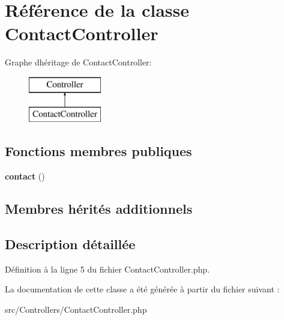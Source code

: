 \hypertarget{class_controllers_1_1_contact_controller}{}\section{Référence de la classe Contact\+Controller}
\label{class_controllers_1_1_contact_controller}
Graphe d\textquotesingle{}héritage de Contact\+Controller\+:\begin{figure}[H]
\begin{center}
\leavevmode
\includegraphics[height=2.000000cm]{class_controllers_1_1_contact_controller}
\end{center}
\end{figure}
\subsection*{Fonctions membres publiques}
\begin{DoxyCompactItemize}
\item 
{\bfseries contact} ()\hypertarget{class_controllers_1_1_contact_controller_a9f5d7f60267d2c2712109d4bc2937612}{}\label{class_controllers_1_1_contact_controller_a9f5d7f60267d2c2712109d4bc2937612}

\end{DoxyCompactItemize}
\subsection*{Membres hérités additionnels}


\subsection{Description détaillée}


Définition à la ligne 5 du fichier Contact\+Controller.\+php.



La documentation de cette classe a été générée à partir du fichier suivant \+:\begin{DoxyCompactItemize}
\item 
src/\+Controllers/Contact\+Controller.\+php\end{DoxyCompactItemize}
